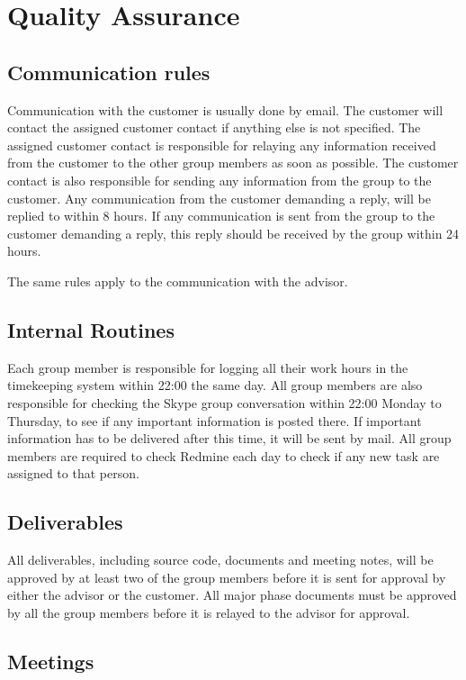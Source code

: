 \section{Quality Assurance}
\subsection{Communication rules}
Communication with the customer is usually done by email. The customer will contact the assigned customer contact if anything else is not specified. The assigned customer contact is responsible for relaying any information received from the customer to the other group members as soon as possible. The customer contact is also responsible for sending any information from the group to the customer. Any communication from the customer demanding a reply, will be replied to within 8 hours. If any communication is sent from the group to the customer demanding a reply, this reply should be received by the group within 24 hours.

The same rules apply to the communication with the advisor.

\subsection{Internal Routines}
Each group member is responsible for logging all their work hours in the timekeeping system within 22:00 the same day. All group members are also responsible for checking the Skype group conversation within 22:00 Monday to Thursday, to see if any important information is posted there. If important information has to be delivered after this time, it will be sent by mail. All group members are required to check Redmine each day to check if any new task are assigned to that person.

\subsection{Deliverables}
All deliverables, including source code, documents and meeting notes, will be approved by at least two of the group members before it is sent for approval by either the advisor or the customer. All major phase documents must be approved by all the group members before it is relayed to the advisor for approval.

\subsection{Meetings}

